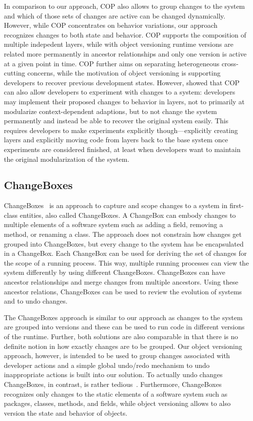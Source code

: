 In comparison to our approach, COP also allows to group changes to the system and which of those sets of changes are active can be changed dynamically.
However, while COP concentrates on behavior variations, our approach recognizes changes to both state and behavior.
COP supports the composition of multiple indepedent layers, while with object versioning runtime versions are related more permanently in ancestor relationships and only one version is active at a given point in time.
COP further aims on separating heterogeneous cross-cutting concerns, while the motivation of object versioning is supporting developers to recover previous development states.
However, \cite{Lincke2012SCS} showed that COP can also allow developers to experiment with changes to a system: developers may implement their proposed changes to behavior in layers, not to primarily at modularize context-dependent adaptions, but to not change the system permanently and instead be able to recover the original system easily.
This requires developers to make experiments explicitly though---explicitly creating layers and explicitly moving code from layers back to the base system once experiments are considered finished, at least when developers want to maintain the original modularization of the system.


\subsection{ChangeBoxes}

ChangeBoxes~\cite{Denker2007EEC} is an approach to capture and scope changes to a system in first-class entities, also called ChangeBoxes.
A ChangeBox can embody changes to multiple elements of a software system such as adding a field, removing a method, or renaming a class.
The approach does not constrain how changes get grouped into ChangeBoxes, but every change to the system has be encapsulated in a ChangeBox.
Each ChangeBox can be used for deriving the set of changes for the scope of a running process.
This way, multiple running processes can view the system differently by using different ChangeBoxes.
ChangeBoxes can have ancestor relationships and merge changes from multiple ancestors.
Using these ancestor relations, ChangeBoxes can be used to review the evolution of systems and to undo changes.

The ChangeBoxes approach is similar to our approach as changes to the system are grouped into versions and these can be used to run code in different versions of the runtime.
Further, both solutions are also comparable in that there is no definite notion in how exactly changes are to be grouped.
Our object versioning approach, however, is intended to be used to group changes associated with developer actions and a simple global undo/redo mechanism to undo inappropriate actions is built into our solution.
To actually undo changes ChangeBoxes, in contrast, is rather tedious~\cite{Steinert2012COE}.
Furthermore, ChangeBoxes recognizes only changes to the static elements of a software system such as packages, classes, methods, and fields, while object versioning allows to also version the state and behavior of objects.


